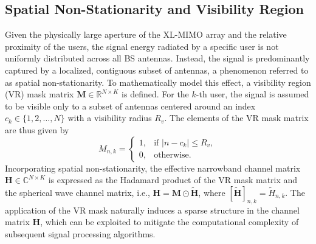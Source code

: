 \subsection{Spatial Non-Stationarity and Visibility Region}
Given the physically large aperture of the XL-MIMO array and the relative proximity of the users, the signal energy radiated by a specific user is not uniformly distributed across all BS antennas. Instead, the signal is predominantly captured by a localized, contiguous subset of antennas, a phenomenon referred to as spatial non-stationarity. To mathematically model this effect, a visibility region (VR) mask matrix $\mathbf{M} \in \mathbb{R}^{N \times K}$ is defined. For the $k$-th user, the signal is assumed to be visible only to a subset of antennas centered around an index $c_k \in \{1, 2, \dots, N\}$ with a visibility radius $R_v$. The elements of the VR mask matrix are thus given by
\begin{equation}
    M_{n,k} = 
    \begin{cases} 
        1, & \text{if } |n - c_k| \le R_v, \\
        0, & \text{otherwise}.
    \end{cases}
\end{equation}
Incorporating spatial non-stationarity, the effective narrowband channel matrix $\mathbf{H} \in \mathbb{C}^{N \times K}$ is expressed as the Hadamard product of the VR mask matrix and the spherical wave channel matrix, i.e., $\mathbf{H} = \mathbf{M} \odot \tilde{\mathbf{H}}$, where $[\tilde{\mathbf{H}}]_{n,k} = \tilde{H}_{n,k}$. The application of the VR mask naturally induces a sparse structure in the channel matrix $\mathbf{H}$, which can be exploited to mitigate the computational complexity of subsequent signal processing algorithms.

